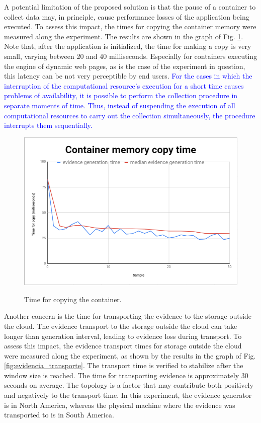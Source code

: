 \documentclass[conference]{IEEEtran}
\begin{document}
A potential limitation of the proposed solution is that the pause of a container to collect data may, in principle, cause performance losses of the application being executed. 
%
To assess this impact, the times for copying the container memory were measured along the experiment.
%
The results are shown in the graph of Fig. \ref{fig:memoria_copia}.
%
Note that, after the application is initialized, the time for making a copy is very small, varying between 20 and 40 milliseconds. 
%
Especially for containers executing the engine of dynamic web pages, as is the case of the experiment in question, this latency can be not very perceptible by end users.
%
\textcolor{blue}{For the cases in which the interruption of the computational resource's execution for a short time causes problems of availability, it is possible to perform the collection procedure in separate moments of time. 
%
Thus, instead of suspending the execution of all computational resources to carry out the collection simultaneously, the procedure interrupts them sequentially.}

\begin{figure}[tb!]
\footnotesize
\caption{Time for copying the container.}
\includegraphics[scale=0.44]{memoria_copia_ieee.png}
\centering
\label{fig:memoria_copia}
\end{figure}


Another concern is the time for transporting the evidence to the storage outside the cloud.
%
The evidence transport to the storage outside the cloud can take longer than generation interval, leading to evidence loss during transport. 
%
To assess this impact, the evidence transport times for storage outside the cloud were measured along the experiment, as shown by the results in the graph of Fig. \ref{fig:evidencia_transporte}.
%
The transport time is verified to stabilize after the window size is reached. 
%
The time for transporting evidence is approximately 30 seconds on average. 
%
The topology is a factor that may contribute both positively and negatively to the transport time. 
%
In this experiment, the evidence generator is in North America, whereas the physical machine where the evidence was transported to is in South America.
\end{document}

